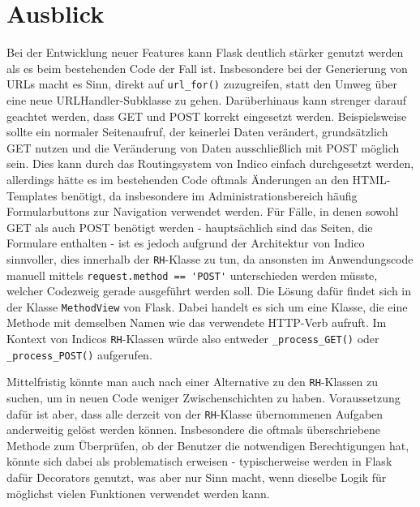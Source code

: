 \section{Ausblick}

Bei der Entwicklung neuer Features kann Flask deutlich stärker genutzt werden als es beim
bestehenden Code der Fall ist. Insbesondere bei der Generierung von URLs macht es Sinn, direkt auf
\lstinline{url_for()} zuzugreifen, statt den Umweg über eine neue URLHandler-Subklasse zu gehen.
Darüberhinaus kann strenger darauf geachtet werden, dass GET und POST korrekt eingesetzt werden.
Beispielsweise sollte ein normaler Seitenaufruf, der keinerlei Daten verändert, grundsätzlich GET
nutzen und die Veränderung von Daten ausschließlich mit POST möglich sein. Dies kann durch das
Routingsystem von Indico einfach durchgesetzt werden, allerdings hätte es im bestehenden Code
oftmals Änderungen an den HTML-Templates benötigt, da insbesondere im Administrationsbereich häufig
Formularbuttons zur Navigation verwendet werden. Für Fälle, in denen sowohl GET als auch POST
benötigt werden - hauptsächlich sind das Seiten, die Formulare enthalten - ist es jedoch aufgrund
der Architektur von Indico sinnvoller, dies innerhalb der \lstinline{RH}-Klasse zu tun, da ansonsten
im Anwendungscode manuell mittels \lstinline{request.method == 'POST'} unterschieden werden müsste,
welcher Codezweig gerade ausgeführt werden soll. Die Lösung dafür findet sich in der Klasse
\lstinline{MethodView} von Flask. Dabei handelt es sich um eine Klasse, die eine Methode mit
demselben Namen wie das verwendete HTTP-Verb aufruft. Im Kontext von Indicos \lstinline{RH}-Klassen
würde also entweder \lstinline{_process_GET()} oder \lstinline{_process_POST()} aufgerufen.

Mittelfristig könnte man auch nach einer Alternative zu den \lstinline{RH}-Klassen zu suchen, um in
neuen Code weniger Zwischenschichten zu haben. Voraussetzung dafür ist aber, dass alle derzeit von
der \lstinline{RH}-Klasse übernommenen Aufgaben anderweitig gelöst werden können. Insbesondere die
oftmals überschriebene Methode zum Überprüfen, ob der Benutzer die notwendigen Berechtigungen hat,
könnte sich dabei als problematisch erweisen - typischerweise werden in Flask dafür Decorators
genutzt, was aber nur Sinn macht, wenn dieselbe Logik für möglichst vielen Funktionen verwendet
werden kann.
